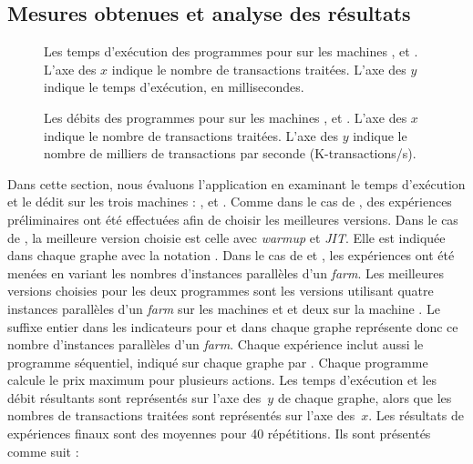 \subsection{Mesures obtenues et analyse des r\'esultats}


\begin{figure}




\caption[Les temps d'exécution des programmes pour  sur
les machines ,  et .]{Les temps d'exécution des programmes
pour  sur les machines ,  et . L'axe des $x$
indique le nombre de transactions traitées. L'axe des $y$ indique le temps d'exécution, en millisecondes.}
\label{StockPrice-temps.fig}
\end{figure}


\begin{figure}




\caption[Les débits pour  sur
les machines ,  et .]{Les débits des programmes
pour  sur les machines ,  et . L'axe des $x$
indique le nombre de transactions traitées. L'axe des $y$ indique le nombre de milliers de transactions par seconde (K-transactions/s).}
\label{StockPrice-debits.fig}
\end{figure}


Dans cette section, nous \'evaluons l'application  en examinant le temps d'ex\'ecution et le d\'edit sur les trois machines : ,  et . Comme dans le cas de , des exp\'eriences pr\'eliminaires ont \'et\'e effectu\'ees afin de choisir les meilleures versions. Dans le cas de , la meilleure version choisie est celle avec \emph{warmup} et \emph{JIT}. Elle est indiqu\'ee dans chaque graphe avec la notation . Dans le cas de  et , les exp\'eriences ont \'et\'e men\'ees en variant les nombres d'instances parall\`eles d'un \emph{farm}. Les meilleures versions choisies pour les deux programmes sont les versions utilisant quatre instances parall\`eles d'un \emph{farm} sur les machines  et  et deux sur la machine . Le suffixe entier dans les indicateurs pour  et  dans chaque graphe repr\'esente donc ce nombre d'instances parall\`eles d'un \emph{farm}. Chaque exp\'erience inclut aussi le programme s\'equentiel, indiqu\'e sur chaque graphe par . Chaque programme calcule le prix maximum pour plusieurs actions. Les temps d'ex\'ecution et les d\'ebit r\'esultants sont repr\'esent\'es sur l'axe des~$y$ de chaque graphe, alors que les nombres de transactions trait\'ees sont repr\'esent\'es sur l'axe des~$x$. Les r\'esultats de exp\'eriences finaux sont des moyennes pour 40 r\'ep\'etitions. Ils sont pr\'esent\'es comme suit :


